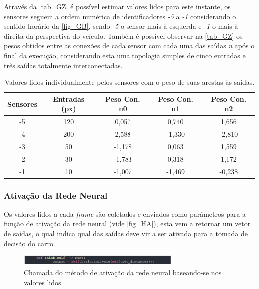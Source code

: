 Através da \autoref{tab_GZ} é possível estimar valores lidos para este instante, os sensores seguem a
ordem numérica de identificadores \textit{-5} a \textit{-1} considerando o sentido horário da \autoref{fig_GB}, sendo \textit{-5} o sensor
mais à esquerda e \textit{-1} o mais à direita da perspectiva do veículo. Também é possível observar na \autoref{tab_GZ}
os pesos obtidos entre as conexões de cada sensor com cada uma das saídas \textit{n} após o final da execução, considerando
esta uma topologia simples de cinco entradas e três saídas totalmente interconectadas.

\begin{table}[htb]
	\centering
    \caption{\label{tab_GZ}Valores lidos individualmente pelos sensores com o peso de suas arestas às saídas.}
    \begin{tabular}{ccccc}
        \hline
		\textbf{Sensores} & \textbf{Entradas (px)} & \textbf{Peso Con. n0} & \textbf{Peso Con. n1} & \textbf{Peso Con. n2} \\ \hline
		-5 & 120  & 0,057   & 0,740  & 1,656   \\ \hline
		-4 & 200  & 2,588   & -1,330  & -2,810   \\ \hline
		-3 & 50  & -1,178   & 0,063  & 1,559   \\ \hline
		-2 & 30  & -1,783   & 0,318  & 1,172  \\ \hline
		-1 & 10  & -1,007   & -1,469  & -0,238   \\ \hline
    \end{tabular}
\end{table}

\subsubsection{Ativação da Rede Neural}
Os valores lidos a cada \textit{frame} são coletados e enviados como parâmetros para a função de ativação da
rede neural (vide \autoref{fig_HA}), esta vem a retornar um vetor de saídas, o qual indica qual das saídas deve
vir a ser ativada para a tomada de decisão do carro.

\begin{figure}[htb]
        \centering
        \caption{\label{fig_HA}Chamada do método de ativação da rede neural baseando-se nos valores lidos.}
        \includegraphics[width=0.7\textwidth]{images/HA.png}
\end{figure}

